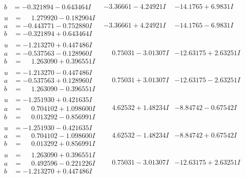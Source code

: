 \documentclass[1p]{elsarticle_modified}
\theoremstyle{definition}
\begin{document}
$$\begin{array}{c|c|c}
\begin{aligned}
b &= -0.321894 - 0.643464 I\end{aligned}
 & -3.36661 - 4.24921 I & -14.1765 + 6.9831 I \\ \hline\begin{aligned}
u &= \phantom{-}1.279920 - 0.182904 I \\
a &= -0.443771 - 0.752880 I \\
b &= -0.321894 + 0.643464 I\end{aligned}
 & -3.36661 + 4.24921 I & -14.1765 - 6.9831 I \\ \hline\begin{aligned}
u &= -1.213270 + 0.447486 I \\
a &= -0.537563 - 0.128960 I \\
b &= \phantom{-}1.263090 + 0.396551 I\end{aligned}
 & \phantom{-}0.75031 - 3.01307 I & -12.63175 + 2.63251 I \\ \hline\begin{aligned}
u &= -1.213270 - 0.447486 I \\
a &= -0.537563 + 0.128960 I \\
b &= \phantom{-}1.263090 - 0.396551 I\end{aligned}
 & \phantom{-}0.75031 + 3.01307 I & -12.63175 - 2.63251 I \\ \hline\begin{aligned}
u &= -1.251930 + 0.421635 I \\
a &= \phantom{-}0.704102 + 1.098600 I \\
b &= \phantom{-}0.013292 - 0.856991 I\end{aligned}
 & \phantom{-}4.62532 + 1.48234 I & -8.84742 - 0.67542 I \\ \hline\begin{aligned}
u &= -1.251930 - 0.421635 I \\
a &= \phantom{-}0.704102 - 1.098600 I \\
b &= \phantom{-}0.013292 + 0.856991 I\end{aligned}
 & \phantom{-}4.62532 - 1.48234 I & -8.84742 + 0.67542 I \\ \hline\begin{aligned}
u &= \phantom{-}1.263090 + 0.396551 I \\
a &= \phantom{-}0.492596 - 0.221226 I \\
b &= -1.213270 + 0.447486 I\end{aligned}
 & \phantom{-}0.75031 - 3.01307 I & -12.63175 + 2.63251 I \\ \hline\begin{aligned}

\end{aligned}
\end{array}$$
\end{document}
